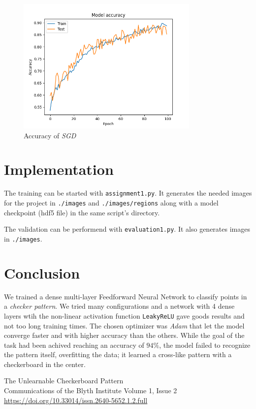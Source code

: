 \documentclass[compsoc]{IEEEtran}
\begin{document}
\begin{figure}[ht!]
\centering                                                                        
\includegraphics[width=3.5in]{../images/accuracy-4000-6-binary_crossentropy-sgd-100-4.png}
\captionsetup{justification=centering}                                                                                                                                   
\caption{Accuracy of \emph{SGD}}
\label{fig:s2}
\end{figure}

\section{Implementation}
The training can be started with \texttt{assignment1.py}. It generates the needed images for the project in \texttt{./images} and \texttt{./images/regions} along with
a model checkpoint (hdf5 file) in the same script's directory.\par
The validation can be performend with \texttt{evaluation1.py}. It also generates images in \texttt{./images}.\par


\section{Conclusion}
We trained a dense multi-layer Feedforward Neural Network to classify points in a \emph{checker pattern}. We tried many configurations and
a network with 4 dense layers wtih the non-linear activation function \texttt{LeakyReLU} gave goods results and not too long
training times. The chosen optimizer was \emph{Adam} that let the model converge faster and with higher accuracy than the others.
While the goal of the task had been achived reaching an accuracy of $94\%$, the model failed to recognize the pattern itself, overfitting the data; it learned
a cross-like pattern with a checkerboard in the center.





\begin{thebibliography}{9}

The Unlearnable Checkerboard Pattern
\\Communications of the Blyth Institute Volume 1, Issue 2
\href{https://doi.org/10.33014/issn.2640-5652.1.2.full}{https://doi.org/10.33014/issn.2640-5652.1.2.full}



\end{thebibliography}
\end{document}
